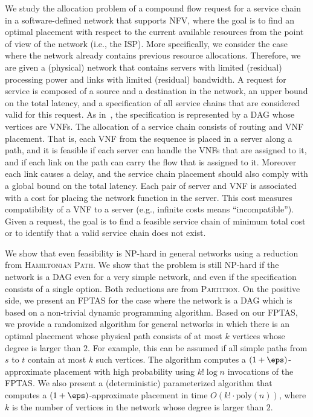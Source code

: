 We study the allocation problem of a compound flow request for a
service chain in a software-defined network that supports NFV, where
the goal is to find an optimal placement with respect to the current
available resources from the point of view of the network (i.e., the
ISP).
%
More specifically, we consider the case where the network already
contains previous resource allocations.  Therefore, we are given a
(physical) network that contains servers with limited (residual)
processing power and links with limited (residual) bandwidth.
%
A request for service is composed of a source and a destination in the
network, an upper bound on the total latency, and a specification of
all service chains that are considered valid for this request.  As
in~\cite{EMP16}, the specification is represented by a DAG whose
vertices are VNFs.
%
The allocation of a service chain consists of routing and VNF
placement.  That is, each VNF from the sequence is placed in a server
along a path, and it is feasible if each server can handle the VNFs
that are assigned to it, and if each link on the path can carry the
flow that is assigned to it.  Moreover each link causes a delay, and
the service chain placement should also comply with a global bound on
the total latency.
%
Each pair of server and VNF is associated with a cost for placing the
network function in the server.  This cost measures compatibility of a
VNF to a server (e.g., infinite costs means ``incompatible'').  Given
a request, the goal is to find a feasible service chain of minimum
total cost or to identify that a valid service chain does not exist.

We show that even feasibility is NP-hard in general networks using a
reduction from \textsc{Hamiltonian Path}.
We show that the problem is still NP-hard if the network is a DAG even
for a very simple network, and even if the specification consists of a
single option.  Both reductions are from \textsc{Partition}.
%
On the positive side, we present an FPTAS for the case where the
network is a DAG which is based on a non-trivial dynamic programming
algorithm.
%
Based on our FPTAS, we provide a randomized algorithm for general
networks in which there is an optimal placement whose physical path
consists of at most $k$ vertices whose degree is larger than $2$.  For
example, this can be assumed if all simple paths from $s$ to $t$
contain at most $k$ such vertices.  The algorithm computes a
$(1+\eps)$-approximate placement with high probability using $k! \log
n$ invocations of the FPTAS.
%
We also present a (deterministic) parameterized algorithm that
computes a $(1+\eps)$-approximate placement in time $O(k! \cdot
\text{poly}(n))$, where $k$ is the number of vertices in the network
whose degree is larger than $2$.


